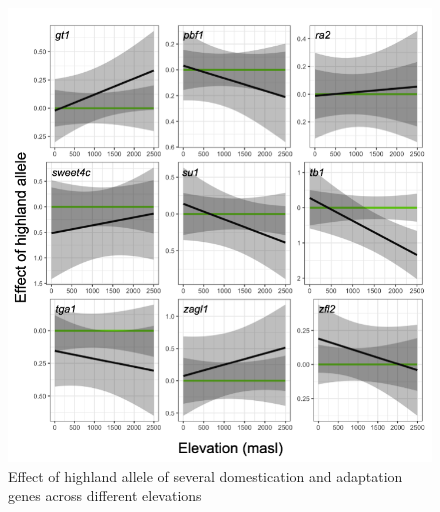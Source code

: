 \documentclass[9pt,twocolumn,twoside,lineno]{biorxiv}
\begin{document}
\begin{figure}[t]
\begin{center}
\includegraphics[width=0.8 \paperwidth]{Sup_Figures/Sup_Fig_13.png}
\caption{Effect of highland allele of several domestication and adaptation genes across different elevations}
\label{figure:Sup:GxE_effect}
\end{center}
\end{figure} 
\end{document}
